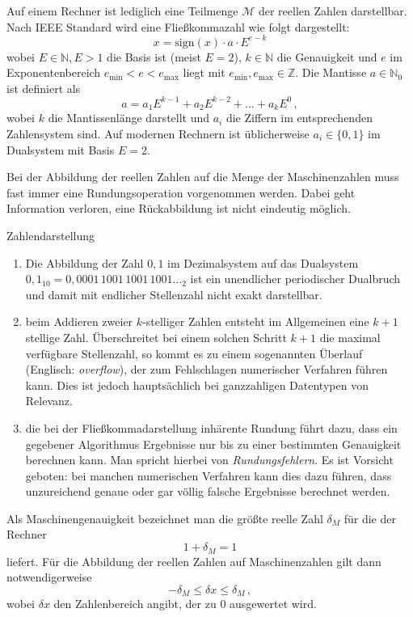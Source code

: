 Auf einem Rechner ist lediglich eine Teilmenge $\mathcal{M}$ der reellen Zahlen darstellbar.
Nach IEEE Standard wird eine Fließkommazahl wie folgt dargestellt:
\begin{equation}
x = \mathrm{sign}(x)\cdot a\cdot E^{e-k}
\end{equation}
wobei $E\in \mathbb{N}, E>1$ die Basis ist (meist $E=2$), $k\in \mathbb{N}$ die Genauigkeit und $e$ im Exponentenbereich $e_\mathrm{min}<e<e_\mathrm{max}$ liegt mit $e_\mathrm{min},e_\mathrm{max}\in \mathbb{Z}$.
Die Mantisse $a\in \mathbb{N}_0$ ist  definiert als
\begin{equation}
a = a_1 E^{k-1} + a_2 E^{k-2} + ... + a_k E^0\,,
\end{equation}
wobei $k$ die Mantissenlänge darstellt und $a_i$ die Ziffern im
entsprechenden Zahlensystem sind. Auf modernen Rechnern ist
üblicherweise $a_i\in\{0,1\}$ im Dualsystem mit Basis $E=2$.

Bei der Abbildung der reellen Zahlen auf die Menge der Maschinenzahlen
muss fast immer eine Rundungsoperation vorgenommen werden. Dabei geht
Information verloren, eine Rückabbildung ist nicht eindeutig möglich.

\begin{myexampleblock}{Zahlendarstellung}
  \begin{enumerate}
   \item Die Abbildung der Zahl $0{,}1$ im Dezimalsystem auf das
    Dualsystem $0{,}1_{10} = 0{,}0001\,1001\,1001\,1001\ldots_2$ ist ein unendlicher
    periodischer Dualbruch und damit mit endlicher Stellenzahl nicht
    exakt darstellbar.
  \item beim Addieren zweier $k$-stelliger Zahlen entsteht im
    Allgemeinen eine $k+1$ stellige Zahl. Überschreitet bei einem
    solchen Schritt $k+1$ die maximal verfügbare Stellenzahl, so kommt
    es zu einem sogenannten Überlauf (Englisch: \emph{overflow}), der
    zum Fehlschlagen numerischer Verfahren führen kann. Dies ist jedoch
    hauptsächlich bei ganzzahligen Datentypen von Relevanz.
  \item die bei der Fließkommadarstellung inhärente Rundung führt dazu, dass 
    ein gegebener Algorithmus Ergebnisse nur bis zu einer bestimmten Genauigkeit
    berechnen kann. Man spricht hierbei von \emph{Rundungsfehlern}.
    Es ist Vorsicht geboten: bei manchen numerischen Verfahren kann dies dazu führen,
    dass unzureichend genaue oder gar völlig falsche Ergebnisse berechnet werden.
    
  \end{enumerate}
\end{myexampleblock}
Als Maschinengenauigkeit bezeichnet man die größte reelle Zahl $\delta_M$ für die der Rechner
\begin{equation}
1 + \delta_M = 1
\end{equation}
liefert.
Für die Abbildung der reellen Zahlen auf Maschinenzahlen gilt dann notwendigerweise
\begin{equation}
-\delta_M \leq \delta x\leq \delta_M\,,
\end{equation}
wobei $\delta x$ den Zahlenbereich angibt, der zu $0$ ausgewertet wird.

